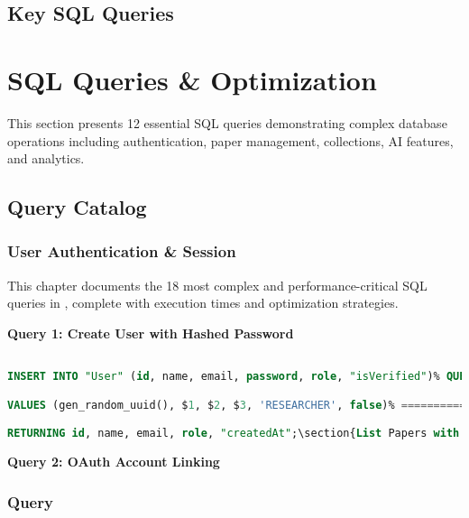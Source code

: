 \section{Key SQL Queries}\chapter{SQL Queries \& Optimization}

\label{sec:sql-queries}\label{ch:sql-queries}



This section presents 12 essential SQL queries demonstrating complex database operations including authentication, paper management, collections, AI features, and analytics.\section{Query Catalog}

\label{sec:query-catalog}

\subsection{User Authentication \& Session}

This chapter documents the 18 most complex and performance-critical SQL queries in \projectname{}, complete with execution times and optimization strategies.

\textbf{Query 1: Create User with Hashed Password}

\begin{lstlisting}[language=SQL,basicstyle=\tiny\ttfamily]% ============================================

INSERT INTO "User" (id, name, email, password, role, "isVerified")% QUERY 1: LIST PAPERS WITH FILTERS

VALUES (gen_random_uuid(), $1, $2, $3, 'RESEARCHER', false)% ============================================

RETURNING id, name, email, role, "createdAt";\section{List Papers with Advanced Filters}

\end{lstlisting}\label{sec:query-list-papers}



\textbf{Query 2: OAuth Account Linking}\subsection{Query}

